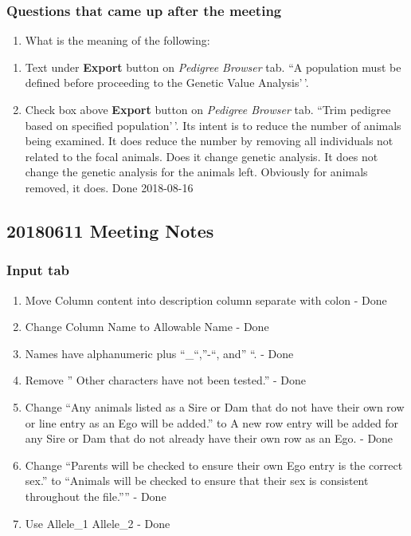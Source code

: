 \documentclass[
]{article}
\providecommand{\tightlist}{%
  \setlength{\itemsep}{0pt}\setlength{\parskip}{0pt}}
\begin{document}
\hypertarget{questions-that-came-up-after-the-meeting}{%
\subsubsection{Questions that came up after the
meeting}\label{questions-that-came-up-after-the-meeting}}

\begin{enumerate}
\def\labelenumi{\arabic{enumi}.}
\tightlist
\item
  What is the meaning of the following:
\end{enumerate}

\begin{enumerate}
\def\labelenumi{\alph{enumi}.}
\tightlist
\item
  Text under \textbf{Export} button on \emph{Pedigree Browser} tab. ``A
  population must be defined before proceeding to the Genetic Value
  Analysis'\,'.
\item
  Check box above \textbf{Export} button on \emph{Pedigree Browser} tab.
  ``Trim pedigree based on specified population'\,'. Its intent is to
  reduce the number of animals being examined. It does reduce the number
  by removing all individuals not related to the focal animals. Does it
  change genetic analysis. It does not change the genetic analysis for
  the animals left. Obviously for animals removed, it does. Done
  2018-08-16
\end{enumerate}

\hypertarget{meeting-notes-1}{%
\subsection{20180611 Meeting Notes}\label{meeting-notes-1}}

\hypertarget{input-tab}{%
\subsubsection{Input tab}\label{input-tab}}

\begin{enumerate}
\def\labelenumi{\arabic{enumi}.}
\tightlist
\item
  Move Column content into description column separate with colon - Done
\item
  Change Column Name to Allowable Name - Done
\item
  Names have alphanumeric plus ``\_``,''-``, and'' ``. - Done
\item
  Remove '' Other characters have not been tested.'' - Done
\item
  Change ``Any animals listed as a Sire or Dam that do not have their
  own row or line entry as an Ego will be added.'' to A new row entry
  will be added for any Sire or Dam that do not already have their own
  row as an Ego. - Done
\item
  Change ``Parents will be checked to ensure their own Ego entry is the
  correct sex.'' to ``Animals will be checked to ensure that their sex
  is consistent throughout the file.'''' - Done
\item
  Use Allele\_1 Allele\_2 - Done
\end{enumerate}
\end{document}
